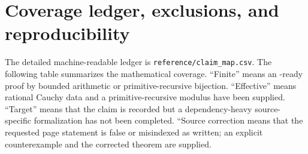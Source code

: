 \section{Coverage ledger, exclusions, and reproducibility}
\label{sec:coverage}

The detailed machine-readable ledger is
\texttt{reference/claim\_map.csv}.  The following table summarizes the
mathematical coverage.  ``Finite'' means an \ipra-ready proof by bounded
arithmetic or primitive-recursive bijection.  ``Effective'' means rational
Cauchy data and a primitive-recursive modulus have been supplied.  ``Target''
means that the claim is recorded but a dependency-heavy source-specific
formalization has not been completed.  ``Source correction means that the
requested page statement is false or misindexed as written; an explicit
counterexample and the corrected theorem are supplied.

